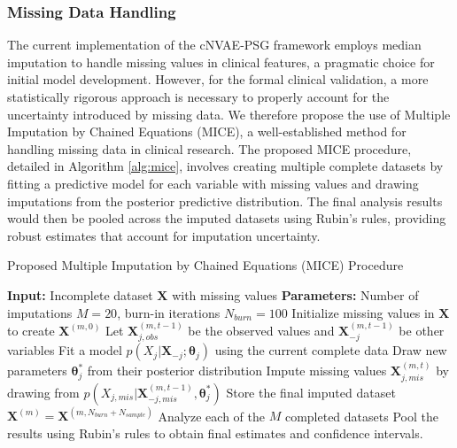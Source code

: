 \documentclass[11pt,en]{elegantpaper}
\begin{document}
\subsubsection{Missing Data Handling}
The current implementation of the cNVAE-PSG framework employs median imputation to handle missing values in clinical features, a pragmatic choice for initial model development. However, for the formal clinical validation, a more statistically rigorous approach is necessary to properly account for the uncertainty introduced by missing data. We therefore propose the use of Multiple Imputation by Chained Equations (MICE), a well-established method for handling missing data in clinical research. The proposed MICE procedure, detailed in Algorithm \ref{alg:mice}, involves creating multiple complete datasets by fitting a predictive model for each variable with missing values and drawing imputations from the posterior predictive distribution. The final analysis results would then be pooled across the imputed datasets using Rubin's rules, providing robust estimates that account for imputation uncertainty.

\begin{algorithm}[H]
\caption{Proposed Multiple Imputation by Chained Equations (MICE) Procedure}
\label{alg:mice}
\begin{algorithmic}[1]
\STATE \textbf{Input:} Incomplete dataset $\mathbf{X}$ with missing values
\STATE \textbf{Parameters:} Number of imputations $M=20$, burn-in iterations $N_{burn}=100$
    \STATE Initialize missing values in $\mathbf{X}$ to create $\mathbf{X}^{(m,0)}$
            \STATE Let $\mathbf{X}_{j,obs}^{(m,t-1)}$ be the observed values and $\mathbf{X}_{-j}^{(m,t-1)}$ be other variables
            \STATE Fit a model $p(X_j | \mathbf{X}_{-j}; \boldsymbol{\theta}_j)$ using the current complete data
            \STATE Draw new parameters $\boldsymbol{\theta}_j^*$ from their posterior distribution
            \STATE Impute missing values $\mathbf{X}_{j,mis}^{(m,t)}$ by drawing from $p(X_{j,mis} | \mathbf{X}_{-j,mis}^{(m,t-1)}, \boldsymbol{\theta}_j^*)$
        \ENDFOR
    \ENDFOR
    \STATE Store the final imputed dataset $\mathbf{X}^{(m)} = \mathbf{X}^{(m, N_{burn}+N_{sample})}$
\ENDFOR
\STATE Analyze each of the $M$ completed datasets
\STATE Pool the results using Rubin's rules to obtain final estimates and confidence intervals.
\end{algorithmic}
\end{algorithm}
\end{document}
